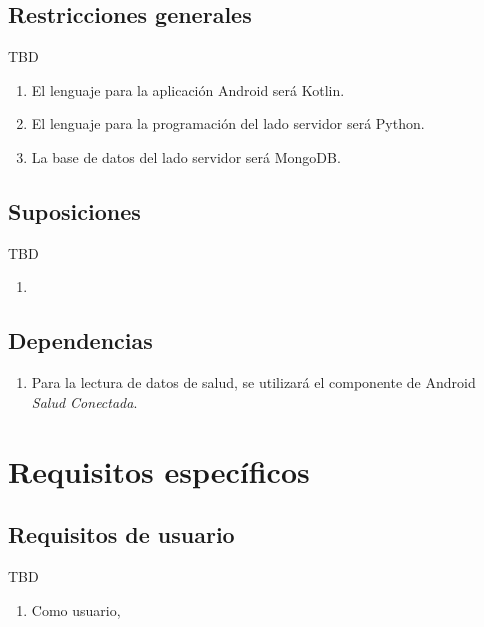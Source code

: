     \subsection{Restricciones generales}
        TBD
        \begin{enumerate}[label=\textbf{RG-\arabic*}]
            \item El lenguaje para la aplicación Android será Kotlin.
            \item El lenguaje para la programación del lado servidor será Python.
            \item La base de datos del lado servidor será MongoDB.
        \end{enumerate}
    
    \subsection{Suposiciones}
        TBD

        \begin{enumerate}[label=\textbf{SUP-\arabic*}]
            \item 
        \end{enumerate}
        
    \subsection{Dependencias}
        \begin{enumerate}[label=\textbf{DEP-\arabic*}]
                \item\label{dep:salud_conectada} Para la lectura de datos de salud, se utilizará el componente de Android \textit{Salud Conectada}.
        \end{enumerate}

\section{Requisitos específicos}

    \subsection{Requisitos de usuario}
        TBD

        \begin{enumerate}[label=\textbf{\texttt{RU-\arabic*}}]
            \item Como usuario, 
        \end{enumerate}
    
